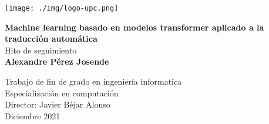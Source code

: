 \begin{titlepage}
\begin{center}

\texttt{[image: ./img/logo-upc.png]}\\[2.0cm]

\vbox{ }

{\LARGE \bfseries  Machine learning basado en modelos transformer aplicado a la traducción automática}\\[1.0cm]
{\Large Hito de seguimiento}\\[3.0cm]

{\large \bfseries Alexandre Pérez Josende}
\vfill

{\normalsize Trabajo de fin de grado en ingeniería informatica}\\
{\normalsize Especialización en computación}\\[0.4cm]

{\normalsize Director: Javier Béjar Alonso}\\

{\normalsize Diciembre 2021}

\end{center}
\end{titlepage}